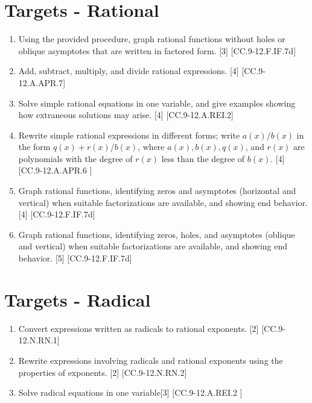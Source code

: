 \documentclass{article}
\begin{document}
\section*{Targets - Rational}
\begin{enumerate}
	\item Using the provided procedure, graph rational functions without holes or oblique asymptotes that are written in factored form. [3] [CC.9-12.F.IF.7d]
	\item Add, subtract, multiply, and divide rational expressions. [4] [CC.9-12.A.APR.7]
	\item Solve simple rational equations in one variable, and give examples showing how extraneous solutions may arise. [4] [CC.9-12.A.REI.2]
	\item Rewrite simple rational expressions in different forms; write $a(x)/b(x)$ in the form $q(x) + r(x)/b(x)$, where $a(x), b(x), q(x)$, and $r(x)$ are polynomials with the degree of $r(x)$ less than the degree of $b(x)$. [4] [CC.9-12.A.APR.6 ]
	\item Graph rational functions, identifying zeros and asymptotes (horizontal and vertical) when suitable factorizations are available, and showing end behavior. [4] [CC.9-12.F.IF.7d]
	\item Graph rational functions, identifying zeros, holes, and asymptotes (oblique and vertical) when suitable factorizations are available, and showing end behavior. [5] [CC.9-12.F.IF.7d]
\end{enumerate}
\newpage
\section*{Targets - Radical}
\begin{enumerate}
	\item Convert expressions written as radicals to rational exponents. [2] [CC.9-12.N.RN.1]
	\item Rewrite expressions involving radicals and rational exponents using the properties of exponents. [2] [CC.9-12.N.RN.2]
	\item Solve radical equations in one variable[3] [CC.9-12.A.REI.2 ]
\end{enumerate}
\newpage
\end{document}
